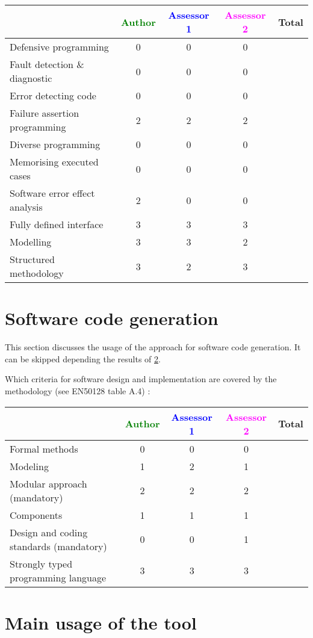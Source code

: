 \begin{tabular}{|l | c | c | c | c|}
\hline
& \textcolor{green}{Author} & \textcolor{blue}{Assessor 1} & \textcolor{magenta}{Assessor 2} & Total \\
\hline
Defensive programming & 0 & 0 & 0 & \\
\hline
Fault detection \& diagnostic & 0 & 0 & 0 & \\
\hline
Error detecting code & 0 & 0 & 0 & \\
\hline
Failure assertion programming & 2 & 2 & 2 & \\
\hline
Diverse programming & 0 & 0 & 0 & \\
\hline
Memorising executed cases & 0 & 0 & 0 & \\
\hline
Software error effect analysis & 2 & 0 & 0 & \\
\hline
Fully defined interface & 3 & 3 & 3 & \\
\hline
Modelling & 3 & 3 & 2 & \\
\hline
Structured methodology & 3 & 2 & 3 & \\
\hline
\end{tabular}

\section{Software code generation}
This section discusses the usage of the approach for software code generation.
It can be skipped depending the results of \ref{main_usage}.

Which criteria for software design and implementation are covered by the methodology
(see EN50128 table A.4) :

\begin{tabular}{|l | c | c | c | c|}
\hline
& \textcolor{green}{Author} & \textcolor{blue}{Assessor 1} & \textcolor{magenta}{Assessor 2} & Total \\
\hline
Formal methods & 0 & 0 & 0 & \\
\hline
Modeling & 1 & 2 & 1 & \\
\hline
Modular approach (mandatory) & 2 & 2 & 2 & \\
\hline
Components & 1 & 1 & 1 & \\
\hline
Design and coding standards (mandatory) & 0 & 0 & 1 & \\
\hline
Strongly typed programming language & 3 & 3 & 3 & \\
\hline
\end{tabular}

\section{Main usage of the tool}
\label{main_usage}

